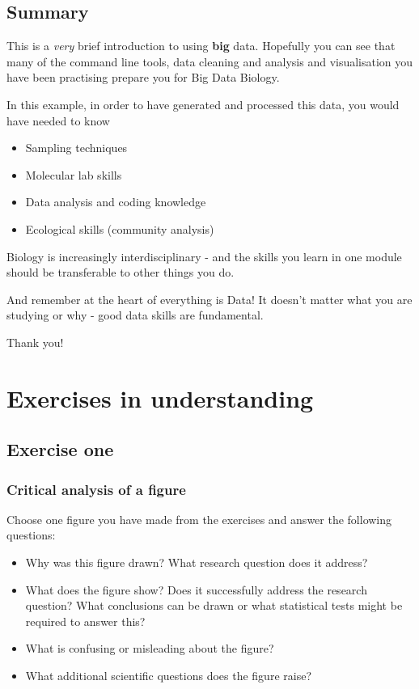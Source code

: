 \documentclass[
]{book}
\providecommand{\tightlist}{%
  \setlength{\itemsep}{0pt}\setlength{\parskip}{0pt}}
\begin{document}
\hypertarget{summary-3}{%
\section{Summary}\label{summary-3}}

This is a \emph{very} brief introduction to using \textbf{big} data. Hopefully you can see that many of the command line tools, data cleaning and analysis and visualisation you have been practising prepare you for Big Data Biology.

In this example, in order to have generated and processed this data, you would have needed to know

\begin{itemize}
\tightlist
\item
  Sampling techniques
\item
  Molecular lab skills
\item
  Data analysis and coding knowledge
\item
  Ecological skills (community analysis)
\end{itemize}

Biology is increasingly interdisciplinary - and the skills you learn in one module should be transferable to other things you do.

And remember at the heart of everything is Data! It doesn't matter what you are studying or why - good data skills are fundamental.

Thank you!

\hypertarget{exercises-in-understanding}{%
\chapter{Exercises in understanding}\label{exercises-in-understanding}}

\hypertarget{exercise-one}{%
\section{Exercise one}\label{exercise-one}}

\hypertarget{critical-analysis-of-a-figure}{%
\subsection{Critical analysis of a figure}\label{critical-analysis-of-a-figure}}

Choose one figure you have made from the exercises and answer the following questions:

\begin{itemize}
\item
  Why was this figure drawn? What research question does it address?
\item
  What does the figure show? Does it successfully address the research question? What conclusions can be drawn or what statistical tests might be required to answer this?
\item
  What is confusing or misleading about the figure?
\item
  What additional scientific questions does the figure raise?
\end{itemize}
\end{document}
